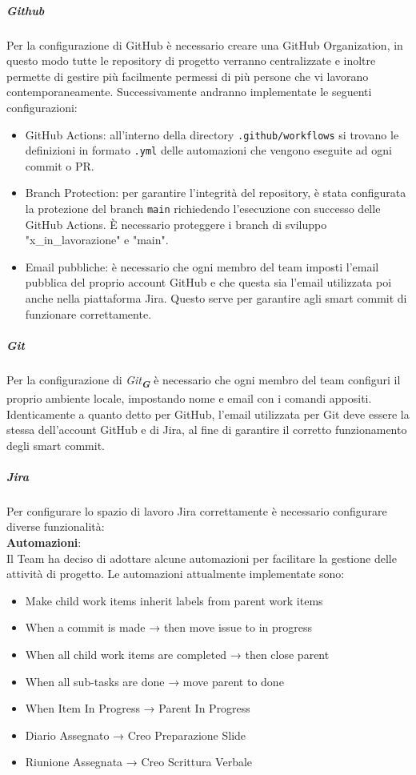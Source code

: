 \documentclass[a4paper,12pt]{article}
\newcommand{\glossario}[1]{\textit{#1}\textsubscript{\textbf{\textit{\textcolor{lightblack}{G}}}}}
\begin{document}
\subparagraph{Github}
Per la configurazione di GitHub è necessario creare una GitHub Organization, in questo modo tutte le repository di progetto
verranno centralizzate e inoltre permette di gestire più facilmente permessi di più persone che vi lavorano contemporaneamente.
Successivamente andranno implementate le seguenti configurazioni:
\begin{itemize}
    \item GitHub Actions: all'interno della directory \texttt{.github/workflows} si trovano le definizioni in formato \texttt{.yml} delle automazioni che vengono eseguite ad ogni commit o PR.
    \item Branch Protection: per garantire l'integrità del repository, è stata configurata la protezione del branch \texttt{main} richiedendo l'esecuzione con successo delle GitHub Actions. \`E necessario proteggere i branch di sviluppo "x\_in\_lavorazione" e "main".
    \item Email pubbliche: è necessario che ogni membro del team imposti l'email pubblica del proprio account GitHub e che questa sia l'email utilizzata poi anche nella piattaforma Jira. Questo serve per garantire agli smart commit di funzionare correttamente.
\end{itemize}

\subparagraph{Git}
Per la configurazione di \glossario{Git} è necessario che ogni membro del team configuri il proprio ambiente locale, impostando nome e email con i comandi appositi.
Identicamente a quanto detto per GitHub, l'email utilizzata per Git deve essere la stessa dell'account GitHub e di Jira, al fine di garantire il corretto funzionamento degli smart commit.

\subparagraph{Jira} \label{conf_jira}
Per configurare lo spazio di lavoro Jira correttamente è necessario configurare diverse funzionalità: \\

\textbf{Automazioni}:\label{JiraAutomation}\\
Il Team ha deciso di adottare alcune automazioni per facilitare la gestione
delle attività di progetto. Le automazioni attualmente implementate sono:
\begin{itemize}
    \item Make child work items inherit labels from parent work items
    \item When a commit is made → then move issue to in progress
    \item When all child work items are completed → then close parent
    \item When all sub-tasks are done → move parent to done
    \item When Item In Progress → Parent In Progress
    \item Diario Assegnato → Creo Preparazione Slide
    \item Riunione Assegnata → Creo Scrittura Verbale
\end{itemize}
\end{document}
